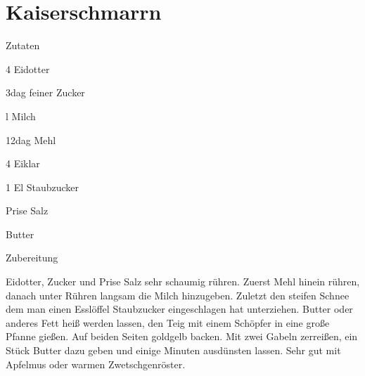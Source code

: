 \chapter*{Kaiserschmarrn}
\begin{multicols}{2}
 {\Large Zutaten}
 \begin{Zutaten}
		\item 4 Eidotter
		\item 3dag feiner Zucker
		\item {}l Milch
		\item 12dag Mehl
		\item 4 Eiklar
		\item 1 El Staubzucker
		\item Prise Salz
		\item Butter
		
\end{Zutaten}
	
\columnbreak
{}
\end{multicols}

{\Large Zubereitung} \newline
\begin{addmargin}[1cm]{0cm}
	Eidotter, Zucker und Prise Salz sehr schaumig rühren.\newline
	Zuerst Mehl hinein rühren, danach unter Rühren langsam die Milch hinzugeben.\newline
	Zuletzt den steifen Schnee dem man einen Esslöffel Staubzucker eingeschlagen hat unterziehen.\newline
	Butter oder anderes Fett heiß werden lassen, den Teig mit einem Schöpfer in eine große Pfanne
	gießen. Auf beiden Seiten goldgelb backen. \newline Mit zwei Gabeln zerreißen, ein Stück Butter dazu geben
	und einige Minuten ausdünsten lassen.\newline\newline
	Sehr gut mit Apfelmus oder warmen Zwetschgenröster.
	
	
\end{addmargin}
